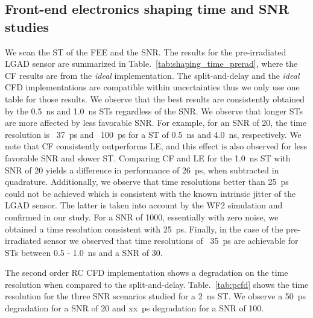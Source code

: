 \documentclass[preprint,1p]{elsarticle}
\begin{document}
\subsection{Front-end electronics shaping time and SNR studies}\label{sec:shaping_time}
We scan the ST of the FEE and the SNR. The results for the pre-irradiated LGAD sensor are summarized in Table.~\ref{tab:shaping_time_prerad},
where the CF results are from the \textit{ideal} implementation. The {\color{red} split-and-delay}
 and the \textit{ideal} CFD implementations are compatible within uncertainties thus we only use one table for those results.
 We observe that the best results are consistently obtained by the 0.5~\si{ns} and 1.0~\si{ns} STs regardless of the SNR. We observe that
 longer STs are more affected by less favorable SNR. For example, for an SNR of 20, the time resolution is ~37~\si{ps} and ~100~\si{ps} for a
ST of 0.5~\si{ns} and 4.0~\si{ns}, respectively. We note that CF consistently outperforms LE, and this effect is also observed
 for less favorable SNR and slower ST. Comparing CF and LE for the 1.0~\si{ns} ST with SNR of 20 yields a difference in performance of
 26~\si{ps}, when subtracted in quadrature. Additionally, we observe that time resolutions better than 25~\si{ps} could not be achieved which
 is consistent with the known intrinsic jitter of the LGAD sensor. The latter is taken into account by the WF2 simulation and
confirmed in our study. For a SNR of 1000, essentially with zero noise, we obtained a time resolution consistent with 25~\si{ps}.
Finally, in the case of the pre-irradiated sensor we observed that time resolutions of ~35~\si{ps} are achievable for
STs between 0.5 - 1.0~\si{ns} and a SNR of 30.

The {\color{red} second order RC} CFD implementation shows a degradation on the time resolution when compared
to the {\color{red} split-and-delay}. Table.~\ref{tab:pcfd} shows the time resolution for the three SNR scenarios
studied for a 2~\si{ns} ST. We observe a 50~\si{ps} degradation for a SNR of 20 and  xx~\si{ps} degradation for a SNR of 100.
\end{document}
